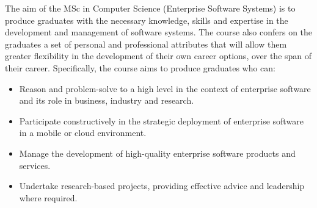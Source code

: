 

\begin{programmeAim}{The aim of the MSc in Computer Science (Enterprise Software Systems) is} to produce graduates with the necessary knowledge, skills and expertise in the development and management of software systems. The course also confers on the graduates a set of personal and professional attributes that will allow them greater flexibility in the development of their own career options, over the span of their career. Specifically, the course aims to produce graduates who can:

\vspace{12pt}
	\begin{itemize}[nolistsep]
		\item
		Reason and problem-solve to a high level in the context of enterprise software and its role in business, industry and research.
		\item
		Participate constructively in the strategic deployment of enterprise software in a mobile or cloud environment.
		\item
		Manage the development of high-quality enterprise software products and services.
		\item
		Undertake research-based projects, providing effective advice and leadership where required.
	\end{itemize}

\end{programmeAim}

\vfill\mbox{}

\vfill



